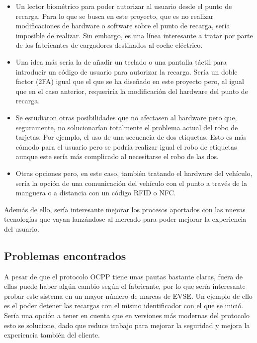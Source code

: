 \documentclass[12pt,a4paper,onecolumn,oneside]{report}
\begin{document}
\begin{itemize}
\item Un lector biométrico para poder autorizar al usuario desde el punto de recarga. Para lo que se busca en este proyecto, que es no realizar modificaciones de hardware o software sobre el punto de recarga, sería imposible de realizar. Sin embargo, es una línea interesante a tratar por parte de los fabricantes de cargadores destinados al coche eléctrico.

\item Una idea más sería la de añadir un teclado o una pantalla táctil para introducir un código de usuario para autorizar la recarga. Sería un doble factor (2FA) igual que el que se ha diseñado en este proyecto pero, al igual que en el caso anterior, requeriría la modificación del hardware del punto de recarga.

\item Se estudiaron otras posibilidades que no afectasen al hardware pero que, seguramente, no solucionarían totalmente el problema actual del robo de tarjetas. Por ejemplo, el uso de una secuencia de dos etiquetas. Esto es más cómodo para el usuario pero se podría realizar igual el robo de etiquetas aunque este sería más complicado al necesitarse el robo de las dos.

\item Otras opciones pero, en este caso, también tratando el hardware del vehículo, sería la opción de una comunicación del vehículo con el punto a través de la manguera o a distancia con un código RFID o NFC.

\end{itemize}

Además de ello, sería interesante mejorar los procesos aportados con las nuevas tecnologías que vayan lanzándose al mercado para poder mejorar la experiencia del usuario.


\subsection*{Problemas encontrados}

A pesar de que el protocolo OCPP tiene unas pautas bastante claras, fuera de ellas puede haber algún cambio según el fabricante, por lo que sería interesante probar este sistema en un mayor número de marcas de EVSE. Un ejemplo de ello es el poder detener las recargas con el mismo identificador con el que se inició. Sería una opción a tener en cuenta que en versiones más modernas del protocolo esto se solucione, dado que reduce trabajo para mejorar la seguridad y mejora la experiencia también del cliente.
\end{document}
